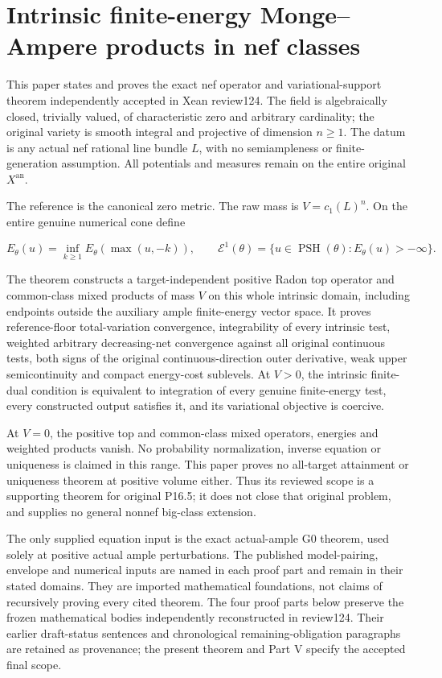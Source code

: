 \documentclass[
]{article}
\author{}
\date{}
\begin{document}
\section{Intrinsic finite-energy Monge--Ampere products in nef
classes}\label{intrinsic-finite-energy-mongeampere-products-in-nef-classes}

This paper states and proves the exact nef operator and
variational-support theorem independently accepted in Xean review124.
The field is algebraically closed, trivially valued, of characteristic
zero and arbitrary cardinality; the original variety is smooth integral
and projective of dimension \(n\geq1\). The datum is any actual nef
rational line bundle \(L\), with no semiampleness or finite-generation
assumption. All potentials and measures remain on the entire original
\(X^{\mathrm{an}}\).

The reference is the canonical zero metric. The raw mass is
\(V=c_1(L)^n\). On the entire genuine numerical cone define

\[E_\theta(u)=\inf_{k\geq1}E_\theta(\max(u,-k)),\qquad
\mathcal E^1(\theta)=\{u\in\operatorname{PSH}(\theta):E_\theta(u)>-\infty\}.\]

The theorem constructs a target-independent positive Radon top operator
and common-class mixed products of mass \(V\) on this whole intrinsic
domain, including endpoints outside the auxiliary ample finite-energy
vector space. It proves reference-floor total-variation convergence,
integrability of every intrinsic test, weighted arbitrary decreasing-net
convergence against all original continuous tests, both signs of the
original continuous-direction outer derivative, weak upper
semicontinuity and compact energy-cost sublevels. At \(V>0\), the
intrinsic finite-dual condition is equivalent to integration of every
genuine finite-energy test, every constructed output satisfies it, and
its variational objective is coercive.

At \(V=0\), the positive top and common-class mixed operators, energies
and weighted products vanish. No probability normalization, inverse
equation or uniqueness is claimed in this range. This paper proves no
all-target attainment or uniqueness theorem at positive volume either.
Thus its reviewed scope is a supporting theorem for original P16.5; it
does not close that original problem, and supplies no general nonnef
big-class extension.

The only supplied equation input is the exact actual-ample G0 theorem,
used solely at positive actual ample perturbations. The published
model-pairing, envelope and numerical inputs are named in each proof
part and remain in their stated domains. They are imported mathematical
foundations, not claims of recursively proving every cited theorem. The
four proof parts below preserve the frozen mathematical bodies
independently reconstructed in review124. Their earlier draft-status
sentences and chronological remaining-obligation paragraphs are retained
as provenance; the present theorem and Part V specify the accepted final
scope.
\end{document}
